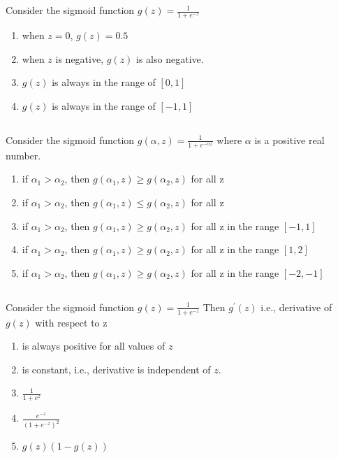 \begin{frame}
\section{}
  Consider the sigmoid function $g(z) = \frac{1}{1+ e^{-z}}$
    \begin{enumerate}[label=(\Alph*)]
      \item when $z=0$, $g(z) = 0.5$    %
          \item when $z$ is negative, $g(z)$ is also negative.
          \item $g(z)$ is always in the range of $[0,1]$    %
          \item $g(z)$ is always in the range of $[-1,1]$
    \end{enumerate}
\end{frame}

\begin{frame}
\section{}
Consider the sigmoid function $g(\alpha, z) = \frac{1}{1+ e^{-\alpha z}}$
  where $\alpha$ is a positive real number.
     \begin{enumerate}[label=(\Alph*)]
       \item if $\alpha_1 > \alpha_2$, then $g(\alpha_1, z) \geq g(\alpha_2, z)$ for all z
      \item if $\alpha_1 > \alpha_2$, then $g(\alpha_1, z) \leq g(\alpha_2, z)$ for all z
      \item if $\alpha_1 > \alpha_2$, then $g(\alpha_1, z) \geq g(\alpha_2, z)$ for all z in the range $[-1,1]$
      \item if $\alpha_1 > \alpha_2$, then $g(\alpha_1, z) \geq g(\alpha_2, z)$ for all z in the range $[1,2]$    %
      \item if $\alpha_1 > \alpha_2$, then $g(\alpha_1, z) \geq g(\alpha_2, z)$ for all z in the range $[-2,-1]$
     \end{enumerate}
\end{frame}

\begin{frame}
\section{}
Consider the sigmoid function $g(z) = \frac{1}{1+ e^{-z}}$
   Then $g^\prime(z)$ i.e., derivative of $g(z)$ with respect to z
    \begin{enumerate}[label=(\Alph*)]
      \item is always positive for all values of $z$    %
      \item is constant, i.e., derivative is independent of $z$.
      \item $\frac{1}{1+e^z}$
      \item $\frac{e^{-z}}{(1+e^{-z})^2}$   %
      \item $g(z)(1-g(z))$    %
    \end{enumerate}
\end{frame}

